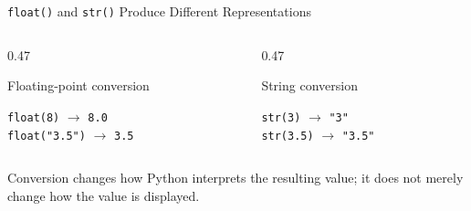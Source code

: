 \documentclass[aspectratio=169,10pt]{beamer}
\begin{document}
\begin{frame}{\texttt{float()} and \texttt{str()} Produce Different Representations}

  \begin{columns}[T,onlytextwidth]

    \begin{column}{0.47\textwidth}

      \begin{block}{Floating-point conversion}

        \texttt{float(8)} $\rightarrow$ \texttt{8.0}\\[0.09in]

        \texttt{float("3.5")} $\rightarrow$ \texttt{3.5}

      \end{block}

    \end{column}

    \begin{column}{0.47\textwidth}

      \begin{block}{String conversion}

        \texttt{str(3)} $\rightarrow$ \texttt{"3"}\\[0.09in]

        \texttt{str(3.5)} $\rightarrow$ \texttt{"3.5"}

      \end{block}

    \end{column}

  \end{columns}

  \begin{keyidea}

    Conversion changes how Python interprets the resulting value; it does not merely change how the value is displayed.

  \end{keyidea}

\end{frame}
\end{document}
